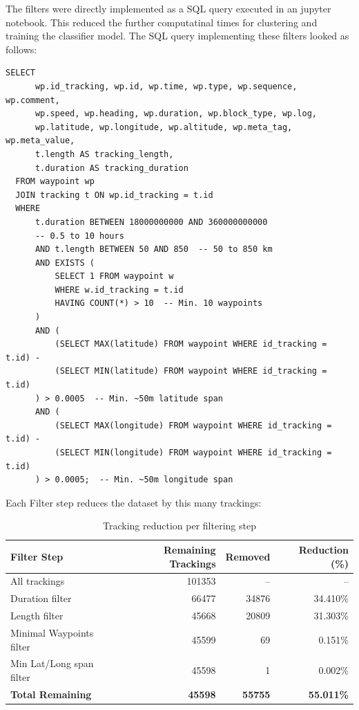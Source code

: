 \documentclass[a4paper,12pt,twoside]{scrreprt}
\begin{document}
The filters were directly implemented as a SQL query executed in an jupyter
notebook. This reduced the further computatinal times for clustering and
training the classifier model. The SQL query implementing these filters looked
as follows:
\begin{lstlisting}[style=sql,caption={SQL query used for filtering the GPS tracking dataset},label={lst:sql-filter}]
  SELECT 
      wp.id_tracking, wp.id, wp.time, wp.type, wp.sequence, wp.comment, 
      wp.speed, wp.heading, wp.duration, wp.block_type, wp.log, 
      wp.latitude, wp.longitude, wp.altitude, wp.meta_tag, wp.meta_value,
      t.length AS tracking_length, 
      t.duration AS tracking_duration
  FROM waypoint wp
  JOIN tracking t ON wp.id_tracking = t.id
  WHERE 
      t.duration BETWEEN 18000000000 AND 360000000000  
      -- 0.5 to 10 hours
      AND t.length BETWEEN 50 AND 850  -- 50 to 850 km
      AND EXISTS (
          SELECT 1 FROM waypoint w 
          WHERE w.id_tracking = t.id
          HAVING COUNT(*) > 10  -- Min. 10 waypoints
      )
      AND (
          (SELECT MAX(latitude) FROM waypoint WHERE id_tracking = t.id) - 
          (SELECT MIN(latitude) FROM waypoint WHERE id_tracking = t.id)
      ) > 0.0005  -- Min. ~50m latitude span
      AND (
          (SELECT MAX(longitude) FROM waypoint WHERE id_tracking = t.id) - 
          (SELECT MIN(longitude) FROM waypoint WHERE id_tracking = t.id)
      ) > 0.0005;  -- Min. ~50m longitude span
  \end{lstlisting}

Each Filter step reduces the dataset by this many trackings:
\begin{table}[ht]
  \centering
  \begin{tabular}{|l|r|r|r|}
    \hline
    \textbf{Filter Step}     & \textbf{Remaining Trackings} &
    \textbf{Removed}
                             &
    \textbf{Reduction (\%)}
    \\
    \hline
    All trackings            & 101353                       & --
                             & --
    \\
    Duration filter          & 66477                        &
    34876
                             &
    34.410\%
    \\
    Length filter            & 45668                        &
    20809
                             &
    31.303\%
    \\
    Minimal Waypoints filter & 45599                        &
    69
                             &
    0.151\%
    \\
    Min Lat/Long span filter & 45598                        &
    1
                             &
    0.002\%
    \\
    \hline
    \textbf{Total Remaining} & \textbf{45598}               &
    \textbf{55755}
                             &
    \textbf{55.011\%}
    \\
    \hline
  \end{tabular}
  \caption{Tracking reduction per filtering step}
  \label{tab:filtering_summary}
\end{table}
\FloatBarrier
\end{document}
